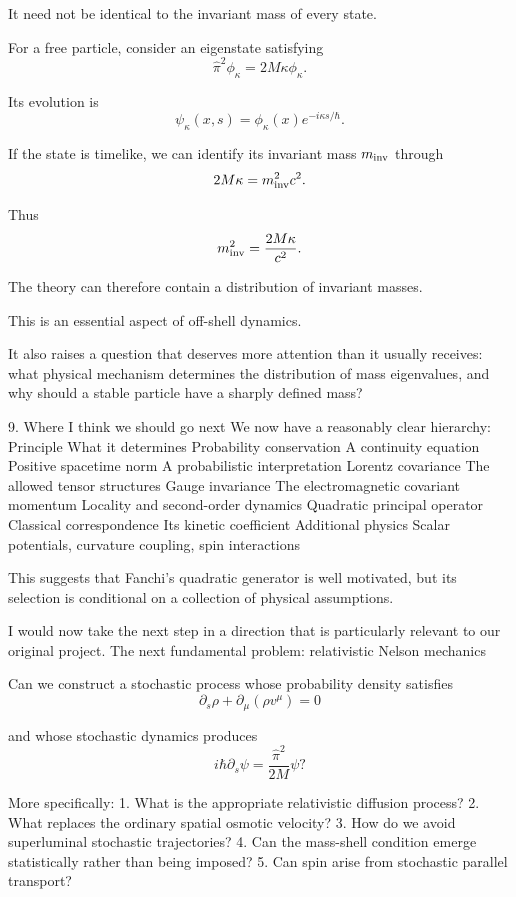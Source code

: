 It need not be identical to the invariant mass of every state.

For a free particle, consider an eigenstate satisfying
\[
\hat\pi^2\phi_\kappa=2M\kappa\phi_\kappa.
\]

Its evolution is
\[
\psi_\kappa(x,s)
=
\phi_\kappa(x)e^{-i\kappa s/\hbar}.
\]

If the state is timelike, we can identify its invariant mass \(m_{\rm inv}\) through
\[
2M\kappa=m_{\rm inv}^2c^2.
\]

Thus
\[
m_{\rm inv}^2=\frac{2M\kappa}{c^2}.
\]

The theory can therefore contain a distribution of invariant masses.

This is an essential aspect of off-shell dynamics.

It also raises a question that deserves more attention than it usually receives: what physical mechanism determines the distribution of mass eigenvalues, and why should a stable particle have a sharply defined mass?

9. Where I think we should go next
We now have a reasonably clear hierarchy:
Principle	What it determines
Probability conservation	A continuity equation
Positive spacetime norm	A probabilistic interpretation
Lorentz covariance	The allowed tensor structures
Gauge invariance	The electromagnetic covariant momentum
Locality and second-order dynamics	Quadratic principal operator
Classical correspondence	Its kinetic coefficient
Additional physics	Scalar potentials, curvature coupling, spin interactions

This suggests that Fanchi's quadratic generator is well motivated, but its selection is conditional on a collection of physical assumptions.

I would now take the next step in a direction that is particularly relevant to our original project.
The next fundamental problem: relativistic Nelson mechanics

Can we construct a stochastic process whose probability density satisfies
\[
\partial_s\rho+\partial_\mu(\rho v^\mu)=0
\]

and whose stochastic dynamics produces
\[
i\hbar\partial_s\psi
=
\frac{\hat\pi^2}{2M}\psi?
\]

More specifically:
1. What is the appropriate relativistic diffusion process?
2. What replaces the ordinary spatial osmotic velocity?
3. How do we avoid superluminal stochastic trajectories?
4. Can the mass-shell condition emerge statistically rather than being imposed?
5. Can spin arise from stochastic parallel transport?

